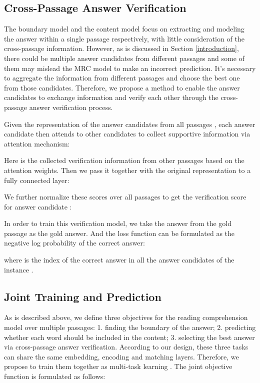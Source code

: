 \documentclass[11pt,a4paper]{article}
\newcommand{\secref}[1]{Section \ref{#1}}
\begin{document}
\subsection{Cross-Passage Answer Verification}
\label{verification}

The boundary model and the content model focus on extracting and modeling the answer within a single passage respectively, 
with little consideration of the cross-passage information. 
However, as is discussed in \secref{introduction}, there could be multiple answer candidates from different passages
and some of them may mislead the MRC model to make an incorrect prediction. It's necessary to aggregate the information from different passages and choose the best one from those candidates. Therefore, we propose a method to enable the answer candidates to exchange information and verify each other through the cross-passage answer verification process. 

Given the representation of the answer candidates from all passages , each answer candidate then attends to other candidates to collect supportive information via attention mechanism:



Here  is the collected verification information from other passages based on the attention weights. Then we pass it together with the original representation  to a fully connected layer:

We further normalize these scores over all passages to get the verification score for answer candidate :



In order to train this verification model, we take the answer from the gold passage as the gold answer. And the loss function can be formulated as the negative log probability of the correct answer:

where  is the index of the correct answer in all the answer candidates of the  instance . 

\subsection{Joint Training and Prediction}
\label{train}

As is described above, we define three objectives for the reading comprehension model over multiple passages: 1. finding the boundary of the answer; 2. predicting whether each word should be included in the content; 3. selecting the best answer via cross-passage answer verification. According to our design, these three tasks can share the same embedding, encoding and matching layers. Therefore, we propose to train them together as multi-task learning \cite{multi-task}. The joint objective function is formulated as follows:
\end{document}
